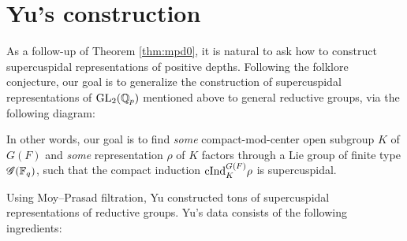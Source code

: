 \section{Yu's construction}
\label{sec:yu}

As a follow-up of Theorem \ref{thm:mpd0}, it is natural to ask how to construct supercuspidal representations of positive depths.
Following the folklore conjecture, our goal is to generalize the construction of supercuspidal representations of $\mathrm{GL}_2(\mathbb{Q}_p)$ mentioned above to general reductive groups, via the following diagram:

\begin{center}
\end{center}

In other words, our goal is to find \emph{some} compact-mod-center open subgroup $K$ of $G(F)$ and \emph{some} representation $\rho$ of $K$ factors through a Lie group of finite type $\mathscr{G}(\mathbb{F}_q)$, such that the compact induction $\mathrm{cInd}_K^{G(F)} \rho$ is supercuspidal.

Using Moy--Prasad filtration, Yu constructed tons of supercuspidal representations of reductive groups.
Yu's data consists of the following ingredients:

